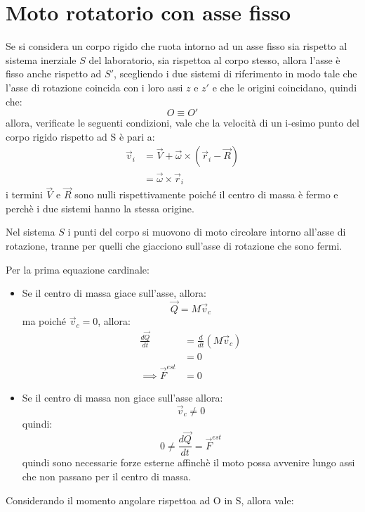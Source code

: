 \documentclass[11pt, a4paper, openright]{book}
\theoremstyle{plain}
\theoremstyle{definition}
\begin{document}
\section{Moto rotatorio con asse fisso}
Se si considera un corpo rigido che ruota intorno ad un asse fisso sia rispetto al sistema inerziale $S$ del laboratorio, sia rispettoa al corpo stesso, allora l'asse è fisso anche rispetto ad $S'$, scegliendo i due sistemi di riferimento in modo tale che l'asse di rotazione coincida con i loro assi $z$ e $z'$ e che le origini coincidano, quindi che:
\begin{equation}
    O \equiv O'
\end{equation}
allora, verificate le seguenti condizioni, vale che la velocità di un i-esimo punto del corpo rigido rispetto ad S è pari a:
\begin{align}
    \vec{v}_i & = \vec{V} + \vec{\omega} \times (\vec{r}_i - \vec{R}) \\
    & = \vec{\omega} \times \vec{r}_i
\end{align}
i termini $\vec{V}$ e $\vec{R}$ sono nulli rispettivamente poiché il centro di massa è fermo e perchè i due sistemi hanno la stessa origine.

Nel sistema $S$ i punti del corpo si muovono di moto circolare intorno all'asse di rotazione, tranne per quelli che giacciono sull'asse di rotazione che sono fermi.

Per la prima equazione cardinale:
\begin{itemize}
    \item Se il centro di massa giace sull'asse, allora:
            \begin{equation}
                \vec{Q} = M \vec{v}_c
            \end{equation}
            ma poiché $\vec{v}_c = 0$, allora:
            \begin{align}
                \frac{d\vec{Q}}{dt} & = \frac{d}{dt}(M \vec{v}_c) \\
                & = 0 \\
                \implies \vec{F}^{est}& = 0  
            \end{align}
    \item Se il centro di massa non giace sull'asse allora:
            \begin{equation}
                \vec{v}_c \not = 0
            \end{equation}
            quindi:
            \begin{equation}
                0 \not = \frac{d\vec{Q}}{dt} = \vec{F}^{est}
            \end{equation}
            quindi sono necessarie forze esterne affinchè il moto possa avvenire lungo assi che non passano per il centro di massa.
\end{itemize}
Considerando il momento angolare rispettoa ad O in S, allora vale:
\end{document}
